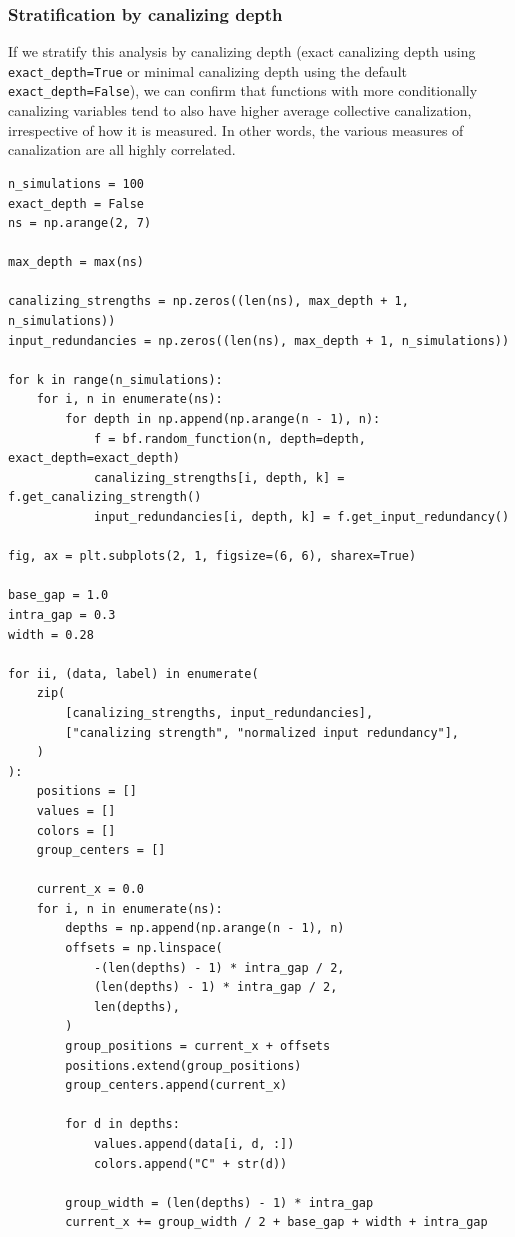 \documentclass[
]{article}
\begin{document}
\subsubsection{Stratification by canalizing
depth}\label{stratification-by-canalizing-depth}

If we stratify this analysis by canalizing depth (exact canalizing depth
using \texttt{exact\_depth=True} or minimal canalizing depth using the
default \texttt{exact\_depth=False}), we can confirm that functions with
more conditionally canalizing variables tend to also have higher average
collective canalization, irrespective of how it is measured. In other
words, the various measures of canalization are all highly correlated.

\begin{lstlisting}
n_simulations = 100
exact_depth = False
ns = np.arange(2, 7)

max_depth = max(ns)

canalizing_strengths = np.zeros((len(ns), max_depth + 1, n_simulations))
input_redundancies = np.zeros((len(ns), max_depth + 1, n_simulations))

for k in range(n_simulations):
    for i, n in enumerate(ns):
        for depth in np.append(np.arange(n - 1), n):
            f = bf.random_function(n, depth=depth, exact_depth=exact_depth)
            canalizing_strengths[i, depth, k] = f.get_canalizing_strength()
            input_redundancies[i, depth, k] = f.get_input_redundancy()

fig, ax = plt.subplots(2, 1, figsize=(6, 6), sharex=True)

base_gap = 1.0
intra_gap = 0.3
width = 0.28

for ii, (data, label) in enumerate(
    zip(
        [canalizing_strengths, input_redundancies],
        ["canalizing strength", "normalized input redundancy"],
    )
):
    positions = []
    values = []
    colors = []
    group_centers = []

    current_x = 0.0
    for i, n in enumerate(ns):
        depths = np.append(np.arange(n - 1), n)
        offsets = np.linspace(
            -(len(depths) - 1) * intra_gap / 2,
            (len(depths) - 1) * intra_gap / 2,
            len(depths),
        )
        group_positions = current_x + offsets
        positions.extend(group_positions)
        group_centers.append(current_x)

        for d in depths:
            values.append(data[i, d, :])
            colors.append("C" + str(d))

        group_width = (len(depths) - 1) * intra_gap
        current_x += group_width / 2 + base_gap + width + intra_gap


\end{lstlisting}
\end{document}
